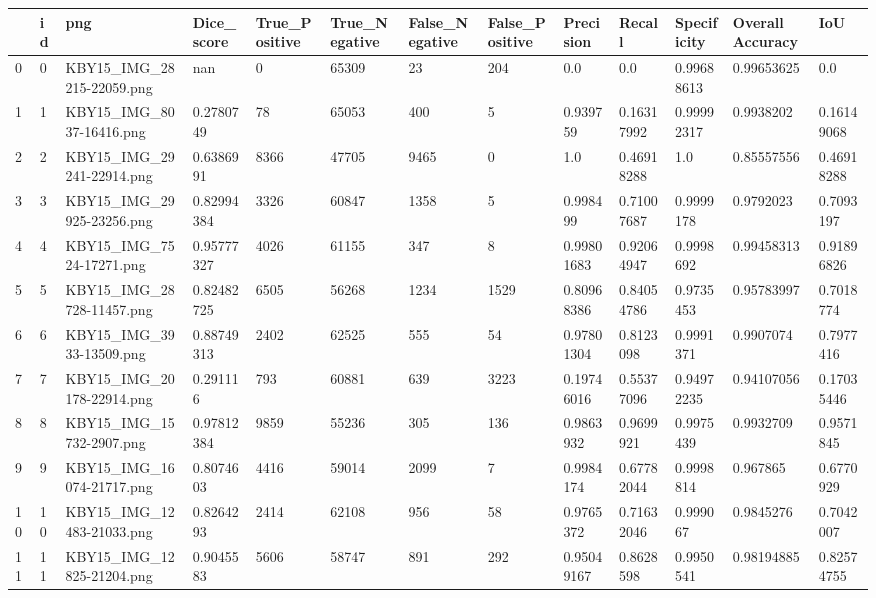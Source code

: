 \documentclass[11pt, a4paper, twoside]{report}
\begin{document}
\begin{longtable}[c]{@{}lllllllllllll@{}}
\toprule
 & id & png & Dice\_score & True\_Positive & True\_Negative & False\_Negative & False\_Positive & Precision & Recall & Specificity & Overall Accuracy & IoU \\* \midrule
\endhead
%
\bottomrule
\endfoot
%
\endlastfoot
%
0 & 0 & KBY15\_IMG\_28215-22059.png & nan & 0 & 65309 & 23 & 204 & 0.0 & 0.0 & 0.99688613 & 0.99653625 & 0.0 \\
1 & 1 & KBY15\_IMG\_8037-16416.png & 0.2780749 & 78 & 65053 & 400 & 5 & 0.939759 & 0.16317992 & 0.99992317 & 0.9938202 & 0.16149068 \\
2 & 2 & KBY15\_IMG\_29241-22914.png & 0.6386991 & 8366 & 47705 & 9465 & 0 & 1.0 & 0.46918288 & 1.0 & 0.85557556 & 0.46918288 \\
3 & 3 & KBY15\_IMG\_29925-23256.png & 0.82994384 & 3326 & 60847 & 1358 & 5 & 0.998499 & 0.71007687 & 0.9999178 & 0.9792023 & 0.7093197 \\
4 & 4 & KBY15\_IMG\_7524-17271.png & 0.95777327 & 4026 & 61155 & 347 & 8 & 0.99801683 & 0.92064947 & 0.9998692 & 0.99458313 & 0.91896826 \\
5 & 5 & KBY15\_IMG\_28728-11457.png & 0.82482725 & 6505 & 56268 & 1234 & 1529 & 0.80968386 & 0.84054786 & 0.9735453 & 0.95783997 & 0.7018774 \\
6 & 6 & KBY15\_IMG\_3933-13509.png & 0.88749313 & 2402 & 62525 & 555 & 54 & 0.97801304 & 0.8123098 & 0.9991371 & 0.9907074 & 0.7977416 \\
7 & 7 & KBY15\_IMG\_20178-22914.png & 0.291116 & 793 & 60881 & 639 & 3223 & 0.19746016 & 0.55377096 & 0.94972235 & 0.94107056 & 0.17035446 \\
8 & 8 & KBY15\_IMG\_15732-2907.png & 0.97812384 & 9859 & 55236 & 305 & 136 & 0.9863932 & 0.9699921 & 0.9975439 & 0.9932709 & 0.9571845 \\
9 & 9 & KBY15\_IMG\_16074-21717.png & 0.8074603 & 4416 & 59014 & 2099 & 7 & 0.9984174 & 0.67782044 & 0.9998814 & 0.967865 & 0.6770929 \\
10 & 10 & KBY15\_IMG\_12483-21033.png & 0.8264293 & 2414 & 62108 & 956 & 58 & 0.9765372 & 0.71632046 & 0.999067 & 0.9845276 & 0.7042007 \\
11 & 11 & KBY15\_IMG\_12825-21204.png & 0.9045583 & 5606 & 58747 & 891 & 292 & 0.95049167 & 0.8628598 & 0.9950541 & 0.98194885 & 0.82574755 \\

\end{longtable}
\end{document}
